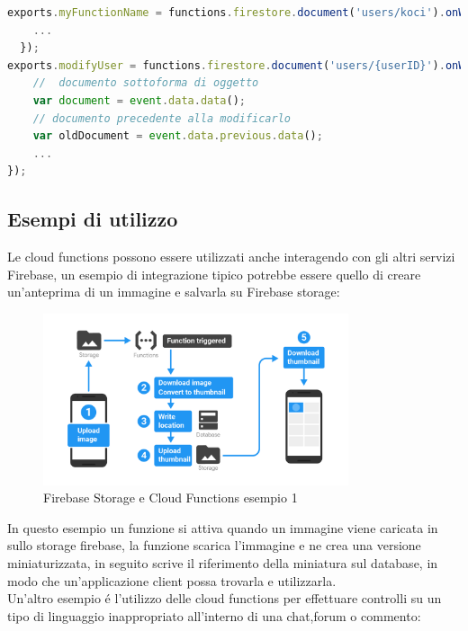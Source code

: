 \begin{lstlisting}[language=javascript,caption={Cloud functions esempio 1 }]
exports.myFunctionName = functions.firestore.document('users/koci').onWrite((event) => {
    ...
  });
exports.modifyUser = functions.firestore.document('users/{userID}').onWrite(event => {
    //  documento sottoforma di oggetto
    var document = event.data.data();
    // documento precedente alla modificarlo
    var oldDocument = event.data.previous.data();
    ...
});
\end{lstlisting}


\newpage              %
\subsection{Esempi di utilizzo}
Le cloud functions possono essere utilizzati anche interagendo con gli altri servizi Firebase, un esempio di integrazione tipico potrebbe essere quello di creare un'anteprima di un immagine e salvarla su Firebase storage:

\begin{figure}[!hb]

  \includegraphics[width=0.8\textwidth]{immagini/functions_ex1.png}
  \caption{Firebase Storage e Cloud Functions esempio 1}
  \label{fig:Firebase Storage e Cloud Functions esempio 1}
\end{figure}

In questo esempio un funzione si attiva quando un immagine viene caricata in sullo storage firebase, la funzione scarica l'immagine e ne crea una versione miniaturizzata, in seguito scrive il riferimento della miniatura sul database, in modo che un'applicazione client possa trovarla e utilizzarla.\\

Un'altro esempio \'e l'utilizzo delle cloud functions per effettuare controlli su un tipo di linguaggio inappropriato all'interno di una chat,forum o commento:\\


